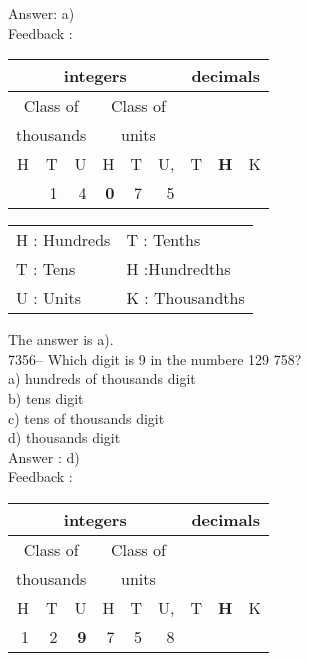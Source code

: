 \documentclass[letterpaper, 12pt]{article}
\begin{document}
Answer: a)\\

Feedback :\\
\begin{center}
\begin{tabular}{|rrr|rrr|rrr|}
\hline
\multicolumn{6}{|c|}{integers} &\multicolumn{3}{|c|}{decimals} \\
\hline
\multicolumn{3}{|c|}{Class of} &\multicolumn{3}{|c|}{Class of} &  \multicolumn{3}{c|}{} \\
\multicolumn{3}{|c|}{thousands} &\multicolumn{3}{|c|}{units} &  \multicolumn{3}{c|}{} \\
\hline
H & T & U &H & T & U, & T\up{th} & \textbf{H\up{th}} & K\up{th} \\
\hline
\hline
 & 1 & 4 & \textbf{0} & 7 & 5 & & & \\
\hline
\end{tabular}
\end{center}

\scriptsize
\begin{center}
\begin{tabular}{ll}
H : Hundreds & T\up{th} : Tenths\\
T : Tens & H\up{th} :Hundredths\\
U : Units & K\up{e} : Thousandths\\
\end{tabular}
\end{center}

\normalsize
The answer is a).\\






7356-- Which digit is 9 in the numbere 129 758?\\

a) hundreds of thousands digit\\
b) tens digit\\
c) tens of thousands digit\\
d) thousands digit\\

Answer : d)\\

Feedback :\\
\begin{center}
\begin{tabular}{|rrr|rrr|rrr|}
\hline
\multicolumn{6}{|c|}{integers} &\multicolumn{3}{|c|}{decimals} \\
\hline
\multicolumn{3}{|c|}{Class of} &\multicolumn{3}{|c|}{Class of} &  \multicolumn{3}{c|}{} \\
\multicolumn{3}{|c|}{thousands} &\multicolumn{3}{|c|}{units} &  \multicolumn{3}{c|}{} \\
\hline
H & T & U &H & T & U, & T\up{th} & \textbf{H\up{th}} & K\up{th} \\
\hline
\hline
 1 & 2 & \textbf{9} & 7 & 5 & 8 & & & \\
\hline
\end{tabular}
\end{center}
\end{document}
